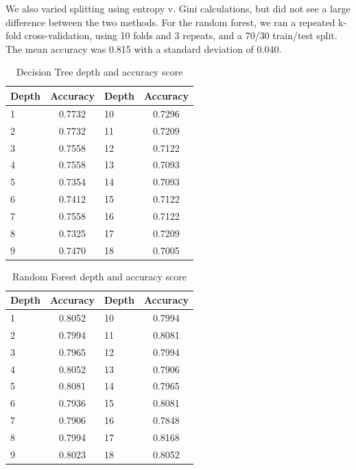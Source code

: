 \documentclass{article}
\begin{document}
We also varied splitting using entropy v. Gini calculations, but did not see a large difference between the two methods. For the random forest, we ran a repeated k-fold cross-validation, using 10 folds and 3 repeats, and a 70/30 train/test split. The mean accuracy was 0.815 with a standard deviation of 0.040.

\begin{table}
  \caption{Decision Tree depth and accuracy score}
  \label{tree_score}
  \centering
\begin{tabular}{lc|lc}
\hline
Depth & Accuracy & Depth & Accuracy \\
\hline
1     & 0.7732  & 10    & 0.7296 \\
2     & 0.7732  & 11    & 0.7209 \\
3     & 0.7558 & 12    & 0.7122 \\
4     & 0.7558 & 13    & 0.7093 \\
5     & 0.7354 & 14    & 0.7093 \\
6     & 0.7412 & 15    & 0.7122 \\
7     & 0.7558 & 16    & 0.7122 \\
8     & 0.7325 & 17    & 0.7209 \\
9     & 0.7470 & 18    & 0.7005 \\
\hline
\end{tabular}
\end{table}

\begin{table}
  \caption{Random Forest depth and accuracy score}
  \label{rf_score}
  \centering
\begin{tabular}{lc|lc}
\hline
Depth & Accuracy & Depth & Accuracy \\
\hline
1     & 0.8052 & 10    & 0.7994 \\
2     & 0.7994 & 11    & 0.8081 \\
3     & 0.7965 & 12    & 0.7994 \\
4     & 0.8052 & 13    & 0.7906 \\
5     & 0.8081 & 14    & 0.7965 \\
6     & 0.7936 & 15    & 0.8081 \\
7     & 0.7906 & 16    & 0.7848 \\
8     & 0.7994 & 17    & 0.8168 \\
9     & 0.8023 & 18    & 0.8052 \\
\hline
\end{tabular}
\end{table}
\end{document}

